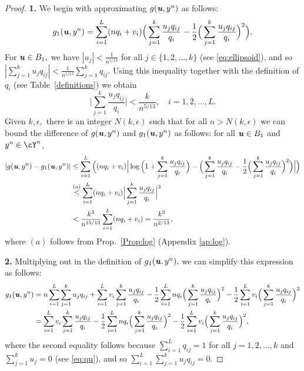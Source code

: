 \documentclass[11pt,onecolumn]{IEEEtran}
\def\mathbi#1{{\textbf{\textit #1}}}
\begin{document}
\begin{proof}
{\bf 1.} We begin with approximating $g(\mathbi{u},y^n)$ as follows:
$$
g_1(\mathbi{u},y^n) = \sum_{i=1}^L   (n q_i + v_i)
 \Big(  \sum_{j=1}^k \frac{u_j q_{ij}}{q_i} -\frac{1}{2} \Big(\sum_{j=1}^k \frac{u_j q_{ij}}{q_i} \Big)^2 \Big) .
$$
For $\mathbi{u}\in B_1,$ we have $|u_j|<\frac{1}{n^{5/13}}$ for all $j\in\{1,2,\dots,k\}$ (see \eqref{eq:ellipsoid}), and so $|\sum_{j=1}^k u_j q_{ij}|< \frac{1}{n^{5/13}} \sum_{j=1}^k q_{ij}.$ Using this inequality together with the definition of $q_i$ (see Table~\ref{definitions})
we obtain 
   \begin{equation}\label{eq:bdr}
\Big|\sum_{j=1}^k \frac{u_j q_{ij}}{q_i} \Big| < \frac{k}{n^{5/13}}
, \quad i=1,2,\dots,L.
\end{equation}
Given $k,\epsilon,$ there is an integer $N(k,\epsilon)$ such that for all $n>N(k,\epsilon)$ we can bound the difference of $g(\mathbi{u},y^n)$ and $g_1(\mathbi{u},y^n)$ as follows: for all  $\mathbi{u}\in B_1$
and $y^n\in\cY^n$,
\begin{align}
|g(\mathbi{u},y^n) - g_1(\mathbi{u},y^n)|
& \le \sum_{i=1}^L  \Big( (n q_i + v_i)
\Big| \log \Big( 1 + \sum_{j=1}^k \frac{u_j q_{ij}}{q_i} \Big) - 
 \Big(  \sum_{j=1}^k \frac{u_j q_{ij}}{q_i} -\frac{1}{2} \Big(\sum_{j=1}^k \frac{u_j q_{ij}}{q_i} \Big)^2 \Big) \Big| \Big) \nonumber\\
& \overset{(a)}{\le} \sum_{i=1}^L   (n q_i + v_i)
\Big|  \sum_{j=1}^k \frac{u_j q_{ij}}{q_i}  \Big|^3 \nonumber \\
& < \frac{k^3}{n^{15/13}} \sum_{i=1}^L  (n q_i + v_i) = \frac{k^3}{n^{2/13}}
, \label{eq:diff1}
\end{align}
where $(a)$ follows from Prop.~\ref{Prop:log} (Appendix \ref{ap:log}). %

\vspace*{.1in}
{\bf 2.} Multiplying out in the definition of $g_1(\mathbi{u},y^n),$ we can simplify this expression as follows:
\begin{align*}
g_1(\mathbi{u},y^n) & = n \sum_{i=1}^L \sum_{j=1}^k u_j q_{ij}
+ \sum_{i=1}^L  v_i \sum_{j=1}^k \frac{u_j q_{ij}}{q_i}
-\frac{1}{2} \sum_{i=1}^L  n q_i  \Big(\sum_{j=1}^k \frac{u_j q_{ij}}{q_i} \Big)^2
-\frac{1}{2} \sum_{i=1}^L   v_i  \Big(\sum_{j=1}^k \frac{u_j q_{ij}}{q_i} \Big)^2 \\
& = \sum_{i=1}^L  v_i \sum_{j=1}^k \frac{u_j q_{ij}}{q_i}
-\frac{1}{2} \sum_{i=1}^L  n q_i  \Big(\sum_{j=1}^k \frac{u_j q_{ij}}{q_i} \Big)^2
-\frac{1}{2} \sum_{i=1}^L   v_i  \Big(\sum_{j=1}^k \frac{u_j q_{ij}}{q_i} \Big)^2,
\end{align*}
where the second equality follows because $\sum_{i=1}^L q_{ij}=1$ for all $j=1,2,\dots,k$ and $\sum_{j=1}^k u_j=0$ (see \eqref{eq:qu}), and so $\sum_{i=1}^L \sum_{j=1}^k u_j q_{ij}=0.$


\end{proof}
\end{document}

